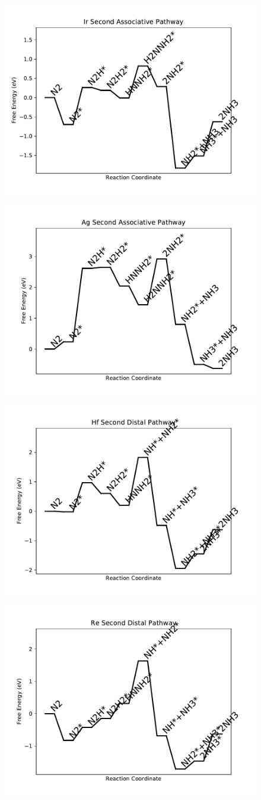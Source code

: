 \documentclass[journal=jacsat,manuscript=article]{achemso}
\begin{document}
\begin{figure}
\includegraphics[width=0.5\linewidth]{data/plots/Ir_associative_2.pdf}
\label{fig:Ir_associative_2}
\end{figure}

\newpage
\begin{figure}
\includegraphics[width=0.5\linewidth]{data/plots/Ag_associative_2.pdf}
\label{fig:Ag_associative_2}
\end{figure}

\begin{figure}
\includegraphics[width=0.5\linewidth]{data/plots/Hf_distal_2.pdf}
\label{fig:Hf_distal_2}
\end{figure}

\newpage
\begin{figure}
\includegraphics[width=0.5\linewidth]{data/plots/Re_distal_2.pdf}
\label{fig:Re_distal_2}
\end{figure}
\end{document}
